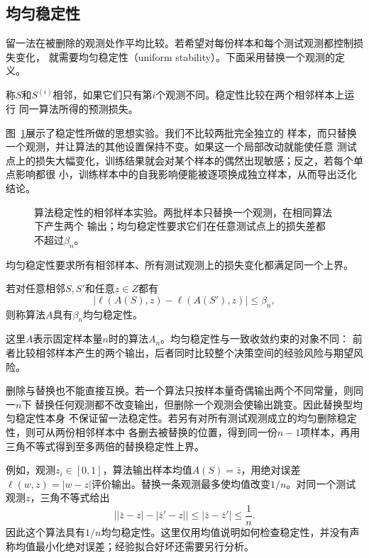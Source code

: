 \subsection{均匀稳定性}
\label{sec:stability-characterization}

留一法在被删除的观测处作平均比较。若希望对每份样本和每个测试观测都控制损失变化，
就需要均匀稳定性（uniform stability）。下面采用替换一个观测的定义。

称$S$和$S^{(i)}$相邻，如果它们只有第$i$个观测不同。稳定性比较在两个相邻样本上运行
同一算法所得的预测损失。

图~\ref{fig:learning-stability}展示了稳定性所做的思想实验。我们不比较两批完全独立的
样本，而只替换一个观测，并让算法的其他设置保持不变。如果这一个局部改动就能使任意
测试点上的损失大幅变化，训练结果就会对某个样本的偶然出现敏感；反之，若每个单点影响都很
小，训练样本中的自我影响便能被逐项换成独立样本，从而导出泛化结论。

\begin{figure}[t]
  \centering
  
  \caption{算法稳定性的相邻样本实验。两批样本只替换一个观测，在相同算法下产生两个
  输出；均匀稳定性要求它们在任意测试点上的损失差都不超过$\beta_n$。}
  \label{fig:learning-stability}
\end{figure}

均匀稳定性要求所有相邻样本、所有测试观测上的损失变化都满足同一个上界。

\begin{definition}[均匀稳定性]
\label{def:uniform-stability}
若对任意相邻$S,S'$和任意$z\in Z$都有
\begin{equation}
 |\ell(A(S),z)-\ell(A(S'),z)|\leq\beta_n,
 \label{eq:uniform-stability}
\end{equation}
则称算法$A$具有$\beta_n$均匀稳定性。
\end{definition}

这里$A$表示固定样本量$n$时的算法$A_n$。均匀稳定性与一致收敛约束的对象不同：
前者比较相邻样本产生的两个输出，后者同时比较整个决策空间的经验风险与期望风险。

删除与替换也不能直接互换。若一个算法只按样本量奇偶输出两个不同常量，则同一$n$下
替换任何观测都不改变输出，但删除一个观测会使输出跳变。因此替换型均匀稳定性本身
不保证留一法稳定性。若另有对所有测试观测成立的均匀删除稳定性，则可从两份相邻样本中
各删去被替换的位置，得到同一份$n-1$项样本，再用三角不等式得到至多两倍的替换稳定性上界。

例如，观测$z_i\in[0,1]$，算法输出样本均值$A(S)=\bar z$，用绝对误差$\ell(w,z)=|w-z|$评价输出。替换一条观测最多使均值改变$1/n$。对同一个测试观测$z$，三角不等式给出
\[
 \bigl||\bar z-z|-|\bar z'-z|\bigr|\leq|\bar z-\bar z'|\leq\frac1n.
\]
因此这个算法具有$1/n$均匀稳定性。这里仅用均值说明如何检查稳定性，并没有声称均值最小化绝对误差；经验拟合好坏还需要另行分析。

